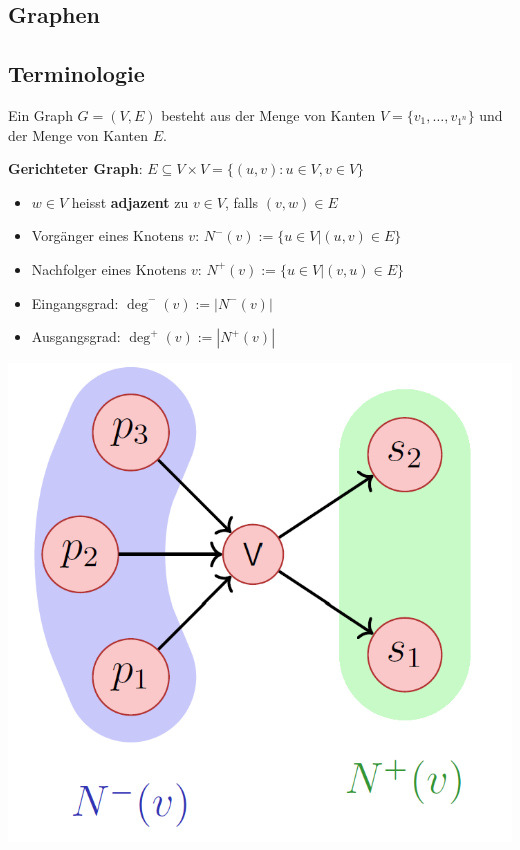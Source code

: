 \vspace{-4pt}
\begin{sectionbox}
\section{Graphen}
\subsection{Terminologie}\smallskip
Ein Graph $G=(V,E)$ besteht aus der Menge von Kanten $V=\{v_{1},\ldots,v_{1^n}\}$ und der Menge von Kanten $E$.\par\smallskip
\end{sectionbox}
\vspace{-4pt}
\begin{sectionbox}
\textbf{Gerichteter Graph}: $E \subseteq V \times V=\{(u, v): u \in V, v \in V\}$\par
\begin{itemize}
    \item $w \in V$ heisst \textbf{adjazent} zu $v \in V$, falls $(v, w) \in E$
    \item Vorgänger eines Knotens $v$: $N^{-}(v):=\{u \in V |(u, v) \in E\}$
    \item Nachfolger eines Knotens $v$: $N^{+}(v):=\{u \in V |(v, u) \in E\}$
    \item Eingangsgrad: $\operatorname{deg}^{-}(v):=|N^{-}(v)|$
    \item Ausgangsgrad: $\operatorname{deg}^{+}(v):=|N^{+}(v)|$
\end{itemize}\par\smallskip
\begin{center}
    \includegraphics[width=0.5\columnwidth]{../img/gerGraph.png}
\end{center}\par\smallskip
\end{sectionbox}
